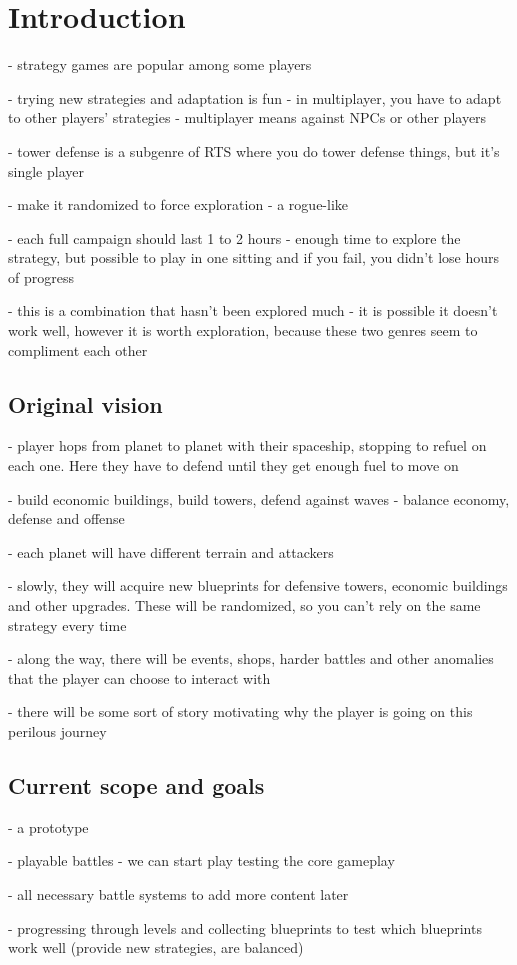 \chapter{Introduction}

- strategy games are popular among some players

- trying new strategies and adaptation is fun - in multiplayer, you have to adapt to other players' strategies - multiplayer means against NPCs or other players

- tower defense is a subgenre of RTS where you do tower defense things, but it's single player

- make it randomized to force exploration - a rogue-like

- each full campaign should last 1 to 2 hours - enough time to explore the strategy, but possible to play in one sitting and if you fail, you didn't lose hours of progress

- this is a combination that hasn't been explored much - it is possible it doesn't work well, however it is worth exploration, because these two genres seem to compliment each other

\section{Original vision}

- player hops from planet to planet with their spaceship, stopping to refuel on each one. Here they have to defend until they get enough fuel to move on

- build economic buildings, build towers, defend against waves - balance economy, defense and offense

- each planet will have different terrain and attackers

- slowly, they will acquire new blueprints for defensive towers, economic buildings and other upgrades. These will be randomized, so you can't rely on the same strategy every time

- along the way, there will be events, shops, harder battles and other anomalies that the player can choose to interact with

- there will be some sort of story motivating why the player is going on this perilous journey

\section{Current scope and goals}

- a prototype

- playable battles - we can start play testing the core gameplay

- all necessary battle systems to add more content later

- progressing through levels and collecting blueprints to test which blueprints work well (provide new strategies, are balanced)

